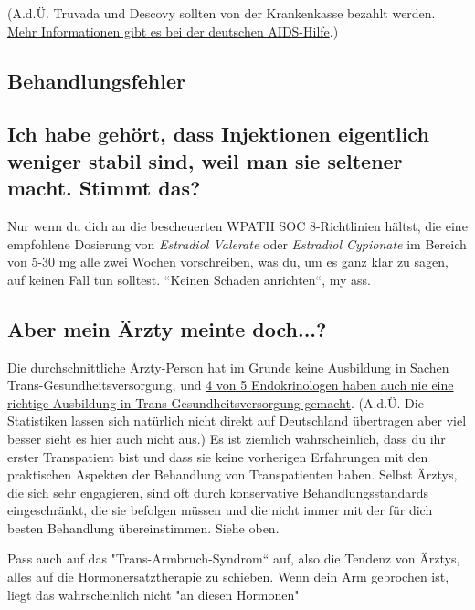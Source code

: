 \documentclass{article}
\begin{document}
(A.d.Ü. Truvada und Descovy sollten von der Krankenkasse bezahlt werden. \href{https://www.aidshilfe.de/de/hiv-prep/prep-praxen-finden-kosten}{Mehr Informationen gibt es bei der deutschen AIDS-Hilfe}.)

\subsection*{Behandlungsfehler}

\subsection{Ich habe gehört, dass Injektionen eigentlich weniger stabil sind, weil man sie seltener macht. Stimmt das?}

Nur wenn du dich an die bescheuerten WPATH SOC 8-Richtlinien hältst, die eine empfohlene Dosierung von \textit{Estradiol Valerate} oder \textit{Estradiol Cypionate} im Bereich von 5-30 mg alle zwei Wochen vorschreiben, was du, um es ganz klar zu sagen, auf keinen Fall tun solltest. “Keinen Schaden anrichten“, my ass.

\subsection{Aber mein Ärzty meinte doch...?}

Die durchschnittliche Ärzty-Person hat im Grunde keine Ausbildung in Sachen Trans-Gesundheitsversorgung, und \href{https://www.endocrine.org/news-and-advocacy/news-room/2017/endocrinologists-want-training-in-transgender-care }{4 von 5 Endokrinologen haben auch nie eine richtige Ausbildung in Trans-Gesundheitsversorgung gemacht}. (A.d.Ü. Die Statistiken lassen sich natürlich nicht direkt auf Deutschland übertragen aber viel besser sieht es hier auch nicht aus.) Es ist ziemlich wahrscheinlich, dass du ihr erster Transpatient bist und dass sie keine vorherigen Erfahrungen mit den praktischen Aspekten der Behandlung von Transpatienten haben. Selbst Ärztys, die sich sehr engagieren, sind oft durch konservative Behandlungsstandards eingeschränkt, die sie befolgen müssen und die nicht immer mit der für dich besten Behandlung übereinstimmen. Siehe oben.

Pass auch auf das "Trans-Armbruch-Syndrom“ auf, also die Tendenz von Ärztys, alles auf die Hormonersatztherapie zu schieben. Wenn dein Arm gebrochen ist, liegt das wahrscheinlich nicht "an diesen Hormonen"
\end{document}
